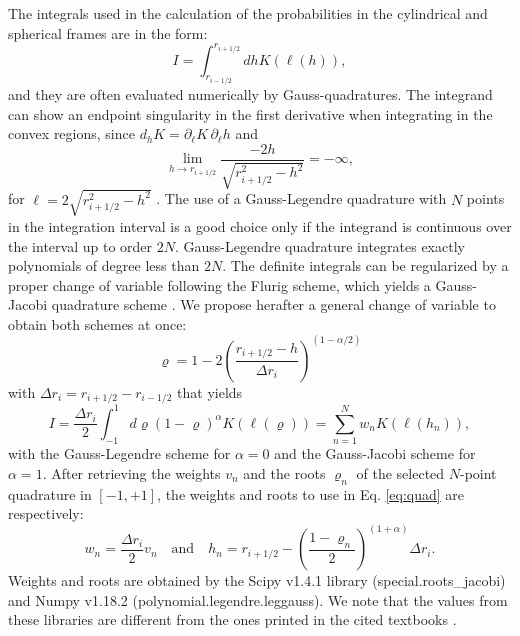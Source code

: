 \documentclass{ictt26}
\begin{document}
The integrals used in the calculation of the probabilities in the cylindrical and spherical frames are in the form:
\[
  I = \int_{r_{i-1/2}}^{r_{i+1/2}}{dh K(\ell(h))},
\]
and they are often evaluated numerically by Gauss-quadratures. The integrand can show an endpoint singularity in the first derivative when integrating in the convex regions, since $d_h K = \partial_{\ell} K\, \partial_{\ell}h$ and 
\[
  \lim_{h \rightarrow r_{i+1/2}}
    \frac{-2h}{\sqrt{r_{i+1/2}^2 - h^2}} = -\infty,
\]
for $\ell = 2\sqrt{r_{i+1/2}^2 - h^2}$ \cite{hebert2009applied}.
The use of a Gauss-Legendre quadrature with $N$ points in the integration interval is a good choice only if the integrand is continuous over the interval up to order $2N$. Gauss-Legendre quadrature integrates exactly polynomials of degree less than $2N$. The definite integrals can be regularized by a proper change of variable following the Flurig scheme, which yields a Gauss-Jacobi quadrature scheme \cite{carlvik1966integral}. We propose herafter a general change of variable to obtain both schemes at once:
\begin{equation}
\label{eq:varchange}
  \varrho = 1 - 2 \left(
      \frac{r_{i+1/2} - h}{\Delta r_i} \right)^{(1-\alpha/2)}
\end{equation}
with $\Delta r_i = r_{i+1/2} - r_{i-1/2}$ that yields
\begin{equation}
\label{eq:quad}
  I = \frac{\Delta r_i}{2}\int_{-1}^{1}{
    d\varrho (1-\varrho)^\alpha
             K(\ell(\varrho))}
    = \sum_{n=1}^N{w_n K(\ell(h_n))},
\end{equation}
with the Gauss-Legendre scheme for $\alpha = 0$ and the Gauss-Jacobi scheme for $\alpha = 1$. %
After retrieving the weights $v_n$ and the roots $\varrho_n$ of the selected $N$-point quadrature in $[-1, +1]$, the weights and roots to use in Eq. \ref{eq:quad} are respectively:
\begin{equation}
\label{eq:wnrn}
  w_n = \frac{\Delta r_i}{2} v_n \quad \text{and} \quad
  h_n = r_{i+1/2}
      - \left(\frac{1-\varrho_n}{2}\right)^{(1+\alpha)}
        \Delta r_i.        
\end{equation}
Weights and roots are obtained by the Scipy v1.4.1 library (special.roots\_jacobi) and Numpy v1.18.2 (polynomial.legendre.leggauss). We note that the values from these libraries are different from the ones printed in the cited textbooks \cite{hebert2009applied,stamm1983methods}.
\end{document}
